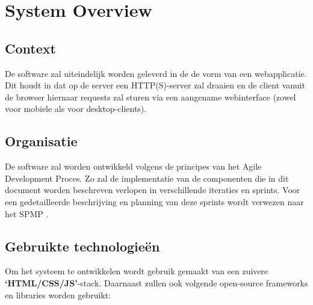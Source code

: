 \documentclass{article}
\begin{document}
\clearpage

\section{System Overview} %

\subsection{Context}

De software zal uiteindelijk worden geleverd in de de vorm van een webapplicatie. Dit houdt in dat op de server een HTTP(S)-server zal draaien en de client vanuit de browser hiernaar requests zal sturen via een aangename webinterface (zowel voor mobiele als voor desktop-clients).

\subsection{Organisatie}

De software zal worden ontwikkeld volgens de principes van het Agile Development Proces. Zo zal de implementatie van de componenten die in dit document worden beschreven verlopen in verschillende iteraties en sprints. Voor een gedetailleerde beschrijving en planning van deze sprints wordt verwezen naar het SPMP \cite{Xtreport:SPMP}.

\subsection{Gebruikte technologie\"en}

Om het systeem te ontwikkelen wordt gebruik gemaakt van een zuivere \textbf{`HTML/CSS/JS'}-stack.
Daarnaast zullen ook volgende open-source frameworks en libraries worden gebruikt:
\end{document}
